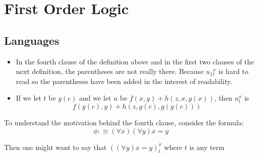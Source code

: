 \chapter{First Order Logic}

\section{Languages}

















\begin{itemize}
    \item  In the fourth clause of the definition above and in the first two clauses of the next definition, the parentheses are not really there. Because $u_{1}{ }_{t}^{x}$ is hard to read so the parentheses have been added in the interest of readability.
    \item If we let $t$ be $g(c)$ and we let $u$ be $f(x, y)+h(z, x, g(x))$, then $u_{t}^{x}$ is
        \[
        f(g(c), y)+h(z, g(c), g(g(c)))
        \]
\end{itemize}




To understand the motivation behind the fourth clause, consider the formula:
\[
\phi :\equiv \left( \forall x \right) \left( \forall y \right) x = y
\]

Then one might want to say that $ \left( \left( \forall y \right) x = y \right) _{ t }^{ x }   $  where $ t $ is any term



